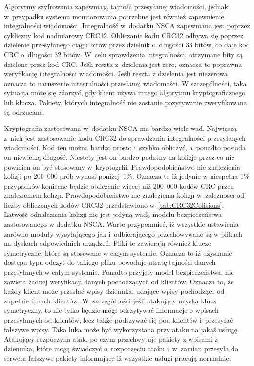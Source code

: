 Algorytmy szyfrowania zapewniają tajność przesyłanej wiadomości,
jednak w~przypadku systemu monitorowania potrzebne jest również
zapewnienie integralności wiadomości. Integralność w~dodatku NSCA
zapewniana jest poprzez cykliczny kod nadmiarowy CRC32. Obliczanie
kodu CRC32 odbywa się poprzez dzielenie przesyłanego ciągu bitów przez
dzielnik o~długości 33 bitów, co daje kod CRC o~długości 32
bitów. W~celu sprawdzenia integralności, otrzymane bity są dzielone
przez kod CRC. Jeśli reszta z~dzielenia jest zero, oznacza to poprawna
weryfikację integralności wiadomości. Jeśli reszta z dzielenia jest
niezerowa oznacza to naruszenie integralności przesłanej wiadomości. W
szczególności, taka sytuacja może się zdarzyć, gdy klient używa innego
algorytmu kryptograficznego lub klucza. Pakiety, których integralność
nie zostanie pozytywanie zweryfikowana są odrzucane.

Kryptografia zastosowana w~dodatku NSCA ma bardzo wiele wad. Najwięszą
z~nich jest zastosowanie kodu CRC32 do sprawdzania integralności
przesyłanych wiadomości. Kod ten można bardzo prosto i~szybko
obliczyć, a~ponadto posiada on niewielką długość. Niestety jest on
bardzo podatny na kolizje przez co nie powinien on być stosowany
w~kryptogrfii. Prawdopodobieństwo nie znalezienia kolizji po 200~000
prób wynosi poniżej~1\%. Oznacza to iż jedynie w niespełna 1\%
przypadków koniecne będzie obliczenie więcej niż 200~000 kodów CRC
przed znalezieniem kolizji. Prawdopodobieństwo nie znalezienia kolizji
w~zalezności od liczby obliczonych kodów CRC32 przedstawiono
w~\ref{tab:CRC32Colisions}. Łatwość odnalezienia kolizji nie jest
jedyną wadą modelu bezpieczeństwa zastosowanego w dodatku NSCA. Warto
przypomnieć, iż wszystkie ustawienia zarówno moduły wysyłającego jak
i~odbierającego przechowywane są w plikach na dyskach odpowiednich
urządzeń. Pliki te zawierają również klucze symetryczne, które są
stosowane w całym systemie. Oznacza to iż uzyskanie dostępu typu
odczyt do takiego pliku powoduje utratę tajności danych przesyłanych w
całym systemie. Ponadto przyjęty model bezpieczeństwa, nie zawiera
żadnej weryfikacji danych pochodzących od klientów. Oznacza to, że
każdy klient moze przesłać wpisy dziennka, udające wpisy pochodzące od
zupełnie innych klientów. W~szczególności jeśli atakujący uzyska klucz
symetryczny, to nie tylko będzie mógł odczytywać informacje o wpisach
przesyłanych od klientów, lecz także podszywać się pod klientów
i~przesyłać fałszywe wpisy. Taka luka może być wykorzystana przy ataku
na jakąś usługę. Atakujący rozpoczyna atak, po czym przechwytuje
pakiety z wpisami z dziennika, które mogą świadczyć o~rozpoczęciu
ataku i~w~zamian przesyła do serwera fałszywe pakiety informujące iż
wszystkie usługi pracują normalnie.

